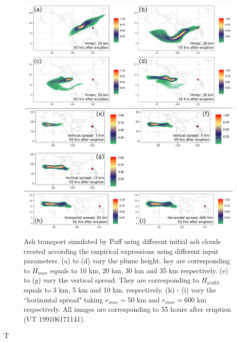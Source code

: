 \documentclass[utf8]{frontiersSCNS} %
\begin{document}
\begin{figure}[!htb]
\centering
\includegraphics[width=0.80 \textwidth]{Figures/discussion}
\caption{Ash transport simulated by Puff using different initial ash clouds created according the empirical expressions using different input parameters. (a) to (d) vary the plume height. hey are corresponding to $H_{max}$ equals to 10 km, 20 km, 30 km and 35 km respectively. (e) to (g) vary the vertical spread.  They are corresponding to $H_{width}$ equals to 3 km, 5 km and 10 km. respectively.  (h) - (i)  vary the ``horizontal spread" taking $r_{max}=$50 km and  $r_{max}=$600 km respectively. All images are corresponding to 55 hours after eruption (UT 199106171141).}
\label{fig:discussion-initial-ash}
\end{figure}
T
\end{document}
